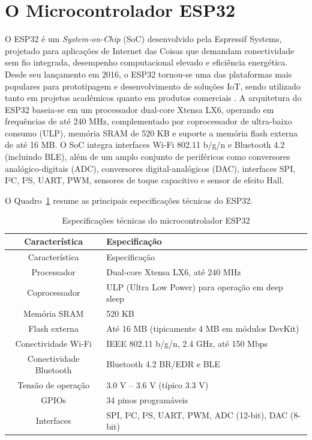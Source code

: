 \section{O Microcontrolador ESP32}\label{o-microcontrolador-esp32}

O ESP32 é um \emph{System-on-Chip} (SoC) desenvolvido pela Espressif
Systems, projetado para aplicações de Internet das Coisas que demandam
conectividade sem fio integrada, desempenho computacional elevado e
eficiência energética. Desde seu lançamento em 2016, o ESP32 tornou-se
uma das plataformas mais populares para prototipagem e desenvolvimento
de soluções IoT, sendo utilizado tanto em projetos acadêmicos quanto em
produtos comerciais \cite{becker2025}. A arquitetura do ESP32 baseia-se
em um processador dual-core Xtensa LX6, operando em frequências de até
240 MHz, complementado por coprocessador de ultra-baixo consumo (ULP),
memória SRAM de 520 KB e suporte a memória flash externa de até 16 MB. O
SoC integra interfaces Wi-Fi 802.11 b/g/n e Bluetooth 4.2 (incluindo
BLE), além de um amplo conjunto de periféricos como conversores
analógico-digitais (ADC), conversores digital-analógicos (DAC),
interfaces SPI, I²C, I²S, UART, PWM, sensores de toque capacitivo e
sensor de efeito Hall.

O Quadro~\ref{quadro:esp32-specs} resume as principais especificações técnicas do ESP32.

{\def\LTcaptype{quadro}
\begin{longtable}[]{@{}cl@{}}
\caption{Especificações técnicas do microcontrolador ESP32}\label{quadro:esp32-specs}\\
\toprule\noalign{}
Característica & Especificação \\
\midrule\noalign{}
\endfirsthead
\toprule\noalign{}
Característica & Especificação \\
\midrule\noalign{}
\endhead
\bottomrule\noalign{}
\endlastfoot
Processador & Dual-core Xtensa LX6, até 240 MHz \\
Coprocessador & ULP (Ultra Low Power) para operação em deep sleep \\
Memória SRAM & 520 KB \\
Flash externa & Até 16 MB (tipicamente 4 MB em módulos DevKit) \\
Conectividade Wi-Fi & IEEE 802.11 b/g/n, 2.4 GHz, até 150 Mbps \\
Conectividade Bluetooth & Bluetooth 4.2 BR/EDR e BLE \\
Tensão de operação & 3.0 V -- 3.6 V (típico 3.3 V) \\
GPIOs & 34 pinos programáveis \\
Interfaces & SPI, I²C, I²S, UART, PWM, ADC (12-bit), DAC (8-bit) \\
\end{longtable}
}

